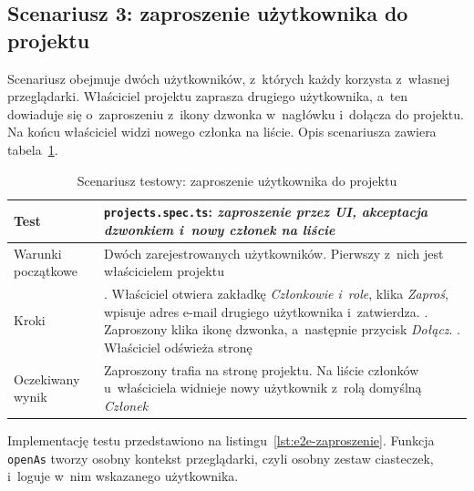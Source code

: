 \subsection{Scenariusz 3: zaproszenie użytkownika do projektu}
Scenariusz obejmuje dwóch użytkowników, z~których każdy korzysta z~własnej przeglądarki. Właściciel projektu zaprasza
drugiego użytkownika, a~ten dowiaduje się o~zaproszeniu z~ikony dzwonka w~nagłówku i~dołącza do projektu.
Na końcu właściciel widzi nowego członka na liście. Opis scenariusza zawiera tabela~\ref{tab:e2e-zaproszenie}.

\begin{table}[htb]
    \centering
    \caption{Scenariusz testowy: zaproszenie użytkownika do projektu}
    \label{tab:e2e-zaproszenie}
    \small
    \begin{tabularx}{\linewidth}{@{}>{\raggedright\arraybackslash}p{3.5cm} >{\raggedright\arraybackslash}X@{}}
        \hline
        Test & \texttt{projects.spec.ts}: \textit{zaproszenie przez UI, akceptacja dzwonkiem i~nowy członek na liście} \\ \hline
        Warunki początkowe & Dwóch zarejestrowanych użytkowników. Pierwszy z~nich jest właścicielem projektu \\ \hline
        Kroki & 1. Właściciel otwiera zakładkę \textit{Członkowie i~role}, klika \textit{Zaproś}, wpisuje adres e-mail drugiego użytkownika i~zatwierdza. \newline 2. Zaproszony klika ikonę dzwonka, a~następnie przycisk \textit{Dołącz}. \newline 3. Właściciel odświeża stronę \\ \hline
        Oczekiwany wynik & Zaproszony trafia na stronę projektu. Na liście członków u~właściciela widnieje nowy użytkownik z~rolą domyślną \textit{Członek} \\ \hline
    \end{tabularx}
\end{table}

Implementację testu przedstawiono na listingu~\ref{lst:e2e-zaproszenie}. Funkcja \texttt{openAs} tworzy osobny
kontekst przeglądarki, czyli osobny zestaw ciasteczek, i~loguje w~nim wskazanego użytkownika.

